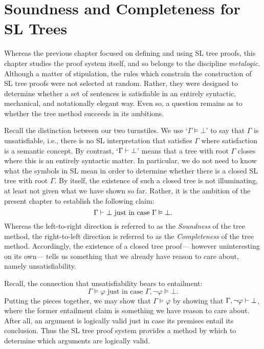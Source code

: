 \chapter{Soundness and Completeness for SL Trees}
\label{ch.SLsoundcomplete}


Whereas the previous chapter focused on defining and using SL tree proofs, this chapter studies the proof system itself, and so belongs to the discipline \emph{metalogic}.
Although a matter of stipulation, the rules which constrain the construction of SL tree proofs were not selected at random.
Rather, they were designed to determine whether a set of sentences is satisfiable in an entirely syntactic, mechanical, and notationally elegant way.
Even so, a question remains as to whether the tree method succeeds in its ambitions.

Recall the distinction between our two turnstiles.
We use `$\Gamma \models \bot$' to say that $\Gamma$ is unsatisfiable, i.e., there is no SL interpretation that satisfies $\Gamma$ where satisfaction is a semantic concept.
By contrast, `$\Gamma \vdash \bot$' means that a tree with root $\Gamma$ closes where this is an entirely syntactic matter.
In particular, we do not need to know what the symbols in SL mean in order to determine whether there is a closed SL tree with root $\Gamma$.
By itself, the existence of such a closed tree is not illuminating, at least not given what we have shown so far.
Rather, it is the ambition of the present chapter to establish the following claim:
  $$\Gamma \vdash \bot \text{ just in case } \Gamma \vDash \bot.$$
Whereas the left-to-right direction is referred to as the \textit{Soundness} of the tree method, the right-to-left direction is referred to as the \textit{Completeness} of the tree method.
Accordingly, the existence of a closed tree proof--- however uninteresting on its own--- tells us something that we already have reason to care about, namely unsatisfiability.

Recall, the connection that unsatisfiability bears to entailment: 
    $$\Gamma \models \varphi \text{ just in case } \Gamma, \neg \varphi \models \bot.$$
Putting the pieces together, we may show that $\Gamma \models \varphi$ by showing that $\Gamma, \neg \varphi \vdash \bot$, where the former entailment claim is something we have reason to care about.
After all, an argument is logically valid just in case its premises entail its conclusion.
Thus the SL tree proof system provides a method by which to determine which arguments are logically valid.





